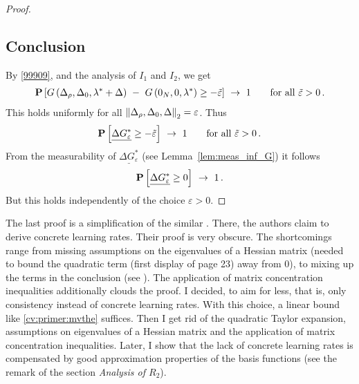 \begin{proof}
\subsection*{Conclusion}
By \eqref{99909}, and the analysis of $I_1$ and $I_2$, we get
\begin{align*}
  \P
  \left[ 
   G
   \left( 
\Delta_\rho,\Delta_0,\lambda^*+\Delta
   \right)
   \ 
   -
   \ 
   G
   \left(
0_N,0,\lambda^*
   \right)
   \ge - 
  \tilde{\varepsilon}
  \right]
  \ 
  \to
  \ 
  1
  \qquad
  \text{for all}\ 
  \tilde{\varepsilon}>0
  \,.
\end{align*}
This holds uniformly for all 
$
\left\lVert
\Delta_\rho,\Delta_0,\Delta
\right\rVert_2=\varepsilon
$.
Thus
\begin{align*}
  \P
  \left[ 
  \underline{\Delta G^*_\varepsilon}
   \ge - 
  \tilde{\varepsilon}
  \right]
  \ 
  \to
  \ 
  1
  \qquad
  \text{for all}\ 
  \tilde{\varepsilon}>0
  \,.
\end{align*}
From the measurability of 
$
  \underline{\Delta G^*_\varepsilon}
$ 
(see Lemma~\ref{lem:meas_inf_G})
it follows
\begin{align*}
  \P
  \left[ 
  \underline{\Delta G^*_\varepsilon}
   \ge 0
  \right]
  \ 
  \to
  \ 
  1
  \,.
\end{align*}
But this holds independently of the choice $\varepsilon>0$.
 \end{proof}
\begin{remark}
  The last proof is a simplification of the similar \cite[Proof of Lemma~2]{Wang2019}. There, the authors claim to derive concrete learning rates. Their proof is very obscure. The shortcomings range from missing assumptions on the eigenvalues of a Hessian matrix (needed to bound the quadratic term (first display of page 23) away from 0), to mixing up the terms in the conclusion (see \cite[page 25]{Wang2019}).
  The application of matrix concentration inequalities additionally clouds the proof. 
  I decided, to aim for less, that is, only consistency instead of concrete learning rates.
  With this choice, a linear bound like \eqref{cv:primer:mvthe} suffices. Then I get rid of the quadratic Taylor expansion, assumptions on eigenvalues of a Hessian matrix and the application of matrix concentration inequalities.
  Later, I show that the lack of concrete learning rates is compensated by good approximation properties of the basis functions (see the remark of the section \textit{Analysis of $R_2$}).
\end{remark}
